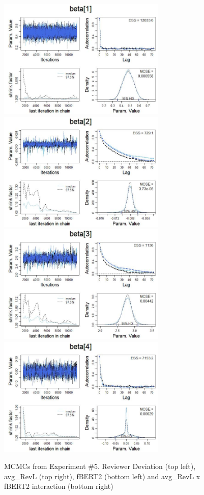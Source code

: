 \begin{figure}
\includegraphics[width=8cm]{experiment_5_1.jpg}
\includegraphics[width=8cm]{experiment_5_2.jpg} \\

\includegraphics[width=8cm]{experiment_5_3.jpg}
\includegraphics[width=8cm]{experiment_5_4.jpg}
\caption{MCMCs from Experiment \#5. Reviewer Deviation (top left), avg\_RevL (top right), fBERT2 (bottom left) and avg\_RevL x fBERT2 interaction (bottom right)}
  \label{Exp5MCMC}
\end{figure}

